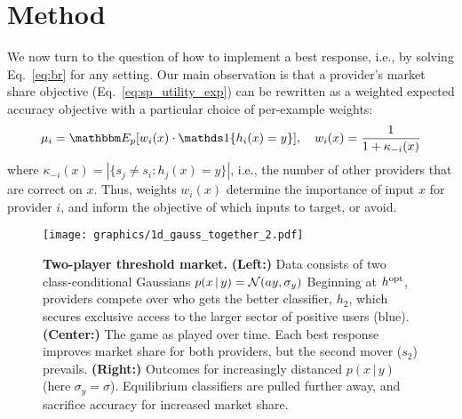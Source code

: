 \section{Method}  \label{sec:method}


We now turn to the question of how to implement a best response,
i.e., by solving Eq.~\eqref{eq:br} for any setting.
Our main observation is that a provider's market share objective
(Eq.~\eqref{eq:sp_utility_exp})
can be rewritten as a weighted expected accuracy objective with a particular choice of per-example weights:
\begin{equation}
\label{eq:weighted_acc_obj}
\ms_i = \expect{p}{w_i(x) \cdot \one{h_i(x)=y}}, \quad
w_i(x) = \frac{1}{1+\kappa_{-i}(x)}
\end{equation}
where $\kappa_{-i}(x)=|\{s_j \neq s_i : h_j(x)=y \}|$,
i.e., the number of other providers that are correct on $x$.
Thus, weights $w_i(x)$ determine the importance of input $x$ for provider $i$,
and inform the objective of which inputs to target, or avoid.
\squeeze



\begin{figure*}[t!]

\texttt{[image: graphics/1d\_gauss\_together\_2.pdf]}
\caption{%
\textbf{Two-player threshold market.}
\textbf{(Left:)} 
Data consists of two class-conditional Gaussians $p(x\,|\,y) = {\cal{N}}(ay,\sigma_y)$
Beginning at $h^{\mathrm{opt}}$, providers compete over who gets the better classifier,
$h_2$, which secures exclusive access to the larger sector of positive users (blue).
\textbf{(Center:)}
The game as played over time. Each best response improves market share for both providers, but the second mover ($s_2$) prevails.
\textbf{(Right:)}
Outcomes for increasingly distanced $p(x\,|\,y)$ (here $\sigma_y=\sigma$).
Equilibrium classifiers are pulled further away, and sacrifice accuracy 
for increased market share.
}
\label{fig:synth}
\end{figure*}

